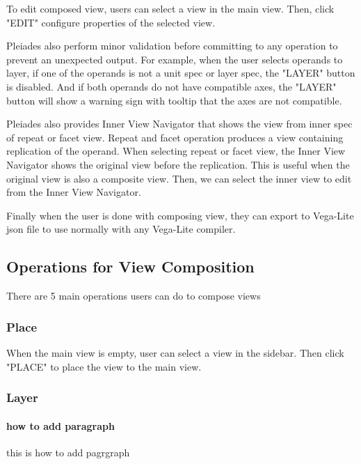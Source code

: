 \documentclass[journal]{vgtc}                %
\begin{document}
To edit composed view, users can select a view in the main view. Then, click "EDIT"
configure properties of the selected view.

Pleiades also perform minor validation before committing to any operation to prevent
an unexpected output. For example, when the user selects operands to layer, if one
of the operands is not a unit spec or layer spec, the "LAYER" button is disabled.
And if both operands do not have compatible axes, the "LAYER" button will show a
warning sign with tooltip that the axes are not compatible.

Pleiades also provides Inner View Navigator that shows the view from inner spec
of repeat or facet view. Repeat and facet operation produces a view containing
replication of the operand. When selecting repeat or facet view, the Inner View
Navigator shows the original view before the replication. This is useful when
the original view is also a composite view. Then, we can select the inner view
to edit from the Inner View Navigator.

Finally when the user is done with composing view, they can export to Vega-Lite
json file to use normally with any Vega-Lite compiler.

\subsection{Operations for View Composition}
There are 5 main operations users can do to compose views

\subsubsection{Place}
When the main view is empty, user can select a view in the sidebar. Then click
"PLACE" to place the view to the main view.

\subsubsection{Layer}


\paragraph{how to add paragraph}

this is how to add pagrgraph




\end{document}
